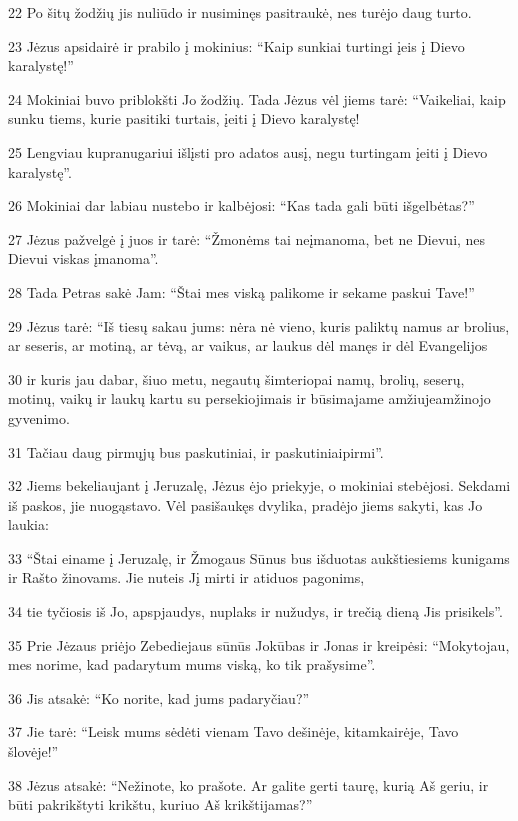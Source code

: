 \par 22 Po šitų žodžių jis nuliūdo ir nusiminęs pasitraukė, nes turėjo daug turto. 
\par 23 Jėzus apsidairė ir prabilo į mokinius: “Kaip sunkiai turtingi įeis į Dievo karalystę!” 
\par 24 Mokiniai buvo priblokšti Jo žodžių. Tada Jėzus vėl jiems tarė: “Vaikeliai, kaip sunku tiems, kurie pasitiki turtais, įeiti į Dievo karalystę! 
\par 25 Lengviau kupranugariui išlįsti pro adatos ausį, negu turtingam įeiti į Dievo karalystę”. 
\par 26 Mokiniai dar labiau nustebo ir kalbėjosi: “Kas tada gali būti išgelbėtas?” 
\par 27 Jėzus pažvelgė į juos ir tarė: “Žmonėms tai neįmanoma, bet ne Dievui, nes Dievui viskas įmanoma”. 
\par 28 Tada Petras sakė Jam: “Štai mes viską palikome ir sekame paskui Tave!” 
\par 29 Jėzus tarė: “Iš tiesų sakau jums: nėra nė vieno, kuris paliktų namus ar brolius, ar seseris, ar motiną, ar tėvą, ar vaikus, ar laukus dėl manęs ir dėl Evangelijos 
\par 30 ir kuris jau dabar, šiuo metu, negautų šimteriopai namų, brolių, seserų, motinų, vaikų ir laukų kartu su persekiojimais ir būsimajame amžiuje­amžinojo gyvenimo. 
\par 31 Tačiau daug pirmųjų bus paskutiniai, ir paskutiniai­pirmi”. 
\par 32 Jiems bekeliaujant į Jeruzalę, Jėzus ėjo priekyje, o mokiniai stebėjosi. Sekdami iš paskos, jie nuogąstavo. Vėl pasišaukęs dvylika, pradėjo jiems sakyti, kas Jo laukia: 
\par 33 “Štai einame į Jeruzalę, ir Žmogaus Sūnus bus išduotas aukštiesiems kunigams ir Rašto žinovams. Jie nuteis Jį mirti ir atiduos pagonims, 
\par 34 tie tyčiosis iš Jo, apspjaudys, nuplaks ir nužudys, ir trečią dieną Jis prisikels”. 
\par 35 Prie Jėzaus priėjo Zebediejaus sūnūs Jokūbas ir Jonas ir kreipėsi: “Mokytojau, mes norime, kad padarytum mums viską, ko tik prašysime”. 
\par 36 Jis atsakė: “Ko norite, kad jums padaryčiau?” 
\par 37 Jie tarė: “Leisk mums sėdėti vienam Tavo dešinėje, kitam­kairėje, Tavo šlovėje!” 
\par 38 Jėzus atsakė: “Nežinote, ko prašote. Ar galite gerti taurę, kurią Aš geriu, ir būti pakrikštyti krikštu, kuriuo Aš krikštijamas?” 
